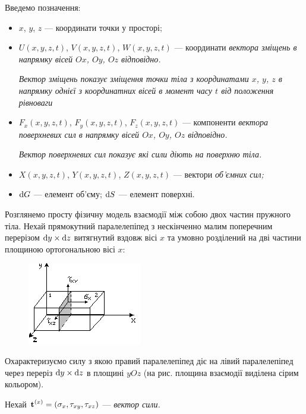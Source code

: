 Введемо позначення:
\begin{itemize}
	\item $x$, $y$, $z$ --- координати точки у просторі;
 	\item $U(x, y, z, t)$, $V(x, y, z, t)$, $W(x, y, z, t)$ --- координати \it{вектора зміщень} в напрямку вісей $Ox$, $Oy$, $Oz$ відповідно.

 	\begin{remark}
 		\it{Вектор зміщень} показує зміщення точки тіла з координатами $x$, $y$, $z$ в напрямку однієї з координатних вісей в момент часу $t$ від положення рівноваги
 	\end{remark}

	\item $F_x(x, y, z, t)$, $F_y(x, y, z, t)$, $F_z(x, y, z, t)$ --- компоненти \it{вектора поверхневих сил} в напрямку вісей $Ox$, $Oy$, $Oz$ відповідно.

	\begin{remark}
		\it{Вектор поверхневих сил} показує які сили діють на поверхню тіла.
	\end{remark}

	\item $X(x, y, z, t)$, $Y(x, y, z, t)$, $Z(x, y, z, t)$ --- вектори \it{об'ємних сил};
	\item $\diff G$ --- елемент об'єму; $\diff S$ --- елемент поверхні.
\end{itemize}

Розглянемо просту фізичну модель взаємодії між собою двох частин пружного тіла. Нехай прямокутний паралелепіпед з нескінченно малим поперечним перерізом $\diff y \times \diff z$ витягнутий вздовж вісі $x$ та умовно розділений на дві частини площиною ортогональною вісі $x$:
\begin{figure}[H]
	\centering
	\includegraphics[]{img/8-1.png}
\end{figure}

Охарактеризуємо силу з якою правий паралелепіпед діє на лівий паралелепіпед через переріз $\diff y \times \diff z$ в площині $yOz$ (на рис. площина взаємодії виділена сірим кольором). \medskip

Нехай $\bf{t}^{(x)} = \left( \sigma_x, \tau_{xy}, \tau_{xz} \right)$ --- \it{вектор сили}.

